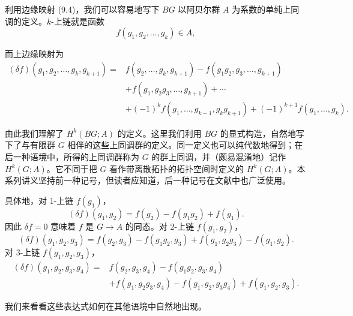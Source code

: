 利用边缘映射 (9.4)，我们可以容易地写下 $BG$ 以阿贝尔群 $A$ 为系数的单纯上同调的定义。$k$-上链就是函数
\begin{equation}
  f(g_1,g_2,\dots,g_k)\in A,
  \tag{9.5}
\end{equation}

而上边缘映射为
\begin{equation}
  \begin{aligned}
    (\delta f)(g_1,g_2,\dots,g_k,g_{k+1})={}&f(g_2,\dots,g_k,g_{k+1})-f(g_1g_2,g_3,\dots,g_{k+1})\\
    &+f(g_1,g_2g_3,\dots,g_{k+1})+\cdots\\
    &+(-1)^k f(g_1,\dots,g_{k-1},g_kg_{k+1})+(-1)^{k+1}f(g_1,\dots,g_k).
  \end{aligned}
  \tag{9.6}
\end{equation}

由此我们理解了 $H^k(BG;A)$ 的定义。这里我们利用 $BG$ 的显式构造，自然地写下了与有限群 $G$ 相伴的这些上同调群的定义。同一定义也可以纯代数地得到；在后一种语境中，所得的上同调群称为 $G$ 的群上同调，并（颇易混淆地）记作 $H^k(G;A)$。它不同于把 $G$ 看作带离散拓扑的拓扑空间时定义的 $H^k(G;A)$。本系列讲义坚持前一种记号，但读者应知道，后一种记号在文献中也广泛使用。

具体地，对 1-上链 $f(g_1)$，
\begin{equation}
  (\delta f)(g_1,g_2)=f(g_2)-f(g_1g_2)+f(g_1).
  \tag{9.7}
\end{equation}
因此 $\delta f=0$ 意味着 $f$ 是 $G\to A$ 的同态。对 2-上链 $f(g_1,g_2)$，
\begin{equation}
  (\delta f)(g_1,g_2,g_3)=f(g_2,g_3)-f(g_1g_2,g_3)+f(g_1,g_2g_3)-f(g_1,g_2).
  \tag{9.8}
\end{equation}
对 3-上链 $f(g_1,g_2,g_3)$，
\begin{equation}
  \begin{aligned}
    (\delta f)(g_1,g_2,g_3,g_4)={}&f(g_2,g_3,g_4)-f(g_1g_2,g_3,g_4)\\
    &+f(g_1,g_2g_3,g_4)-f(g_1,g_2,g_3g_4)+f(g_1,g_2,g_3).
  \end{aligned}
  \tag{9.9}
\end{equation}

我们来看看这些表达式如何在其他语境中自然地出现。


